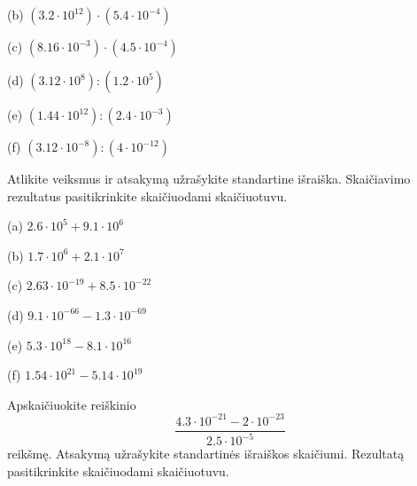 \begin{multicols}{2}
\begin{puzd}
\begin{multicols}{2}
(b) $(3.2 \cdot 10^{12}) \cdot (5.4 \cdot 10^{-4})$  

(c) $(8.16 \cdot 10^{-3}) \cdot (4.5 \cdot 10^{-4})$  

(d) $(3.12 \cdot 10^8) : (1.2 \cdot 10^5)$  

(e) $(1.44 \cdot 10^{12}) : (2.4 \cdot 10^{-3})$  

(f) $(3.12 \cdot 10^{-8}) : (4 \cdot 10^{-12})$
\end{multicols}
\end{puzd}
\begin{puzd}
Atlikite veiksmus ir atsakymą užrašykite standartine išraiška.  
Skaičiavimo rezultatus pasitikrinkite skaičiuodami skaičiuotuvu.

\resetcolumnrule
\begin{multicols}{2}
(a) $2.6 \cdot 10^5 + 9.1 \cdot 10^6$  

(b) $1.7 \cdot 10^6 + 2.1 \cdot 10^7$  

(c) $2.63 \cdot 10^{-19} + 8.5 \cdot 10^{-22}$  

(d) $9.1 \cdot 10^{-66} - 1.3 \cdot 10^{-69}$  

(e) $5.3 \cdot 10^{18} - 8.1 \cdot 10^{16}$  

(f) $1.54 \cdot 10^{21} - 5.14 \cdot 10^{19}$
\end{multicols}
\end{puzd}

\begin{puzd}
Apskaičiuokite reiškinio  
\[
\frac{4.3 \cdot 10^{-21} - 2 \cdot 10^{-23}}{2.5 \cdot 10^{-5}}
\]  
reikšmę. Atsakymą užrašykite standartinės išraiškos skaičiumi.  
Rezultatą pasitikrinkite skaičiuodami skaičiuotuvu.
\end{puzd}
\end{multicols}